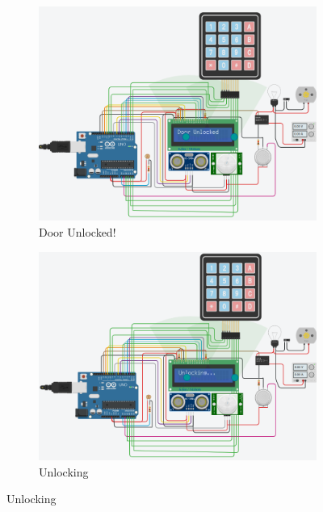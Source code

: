 \documentclass[a4paper,12pt]{article}
\begin{document}
\begin{figure}[H]
  \vspace{1em} %

  \begin{subfigure}{0.45\textwidth}
      \centering
      \includegraphics[width=\linewidth]{circuit_overview1.png}
      \caption{Door Unlocked!}
  \end{subfigure}
  \hfill
  \begin{subfigure}{0.45\textwidth}
      \centering
      \includegraphics[width=\linewidth]{circuit_overview3.png}
      \caption{Unlocking}
  \end{subfigure}
  

\end{figure}
\end{document}
